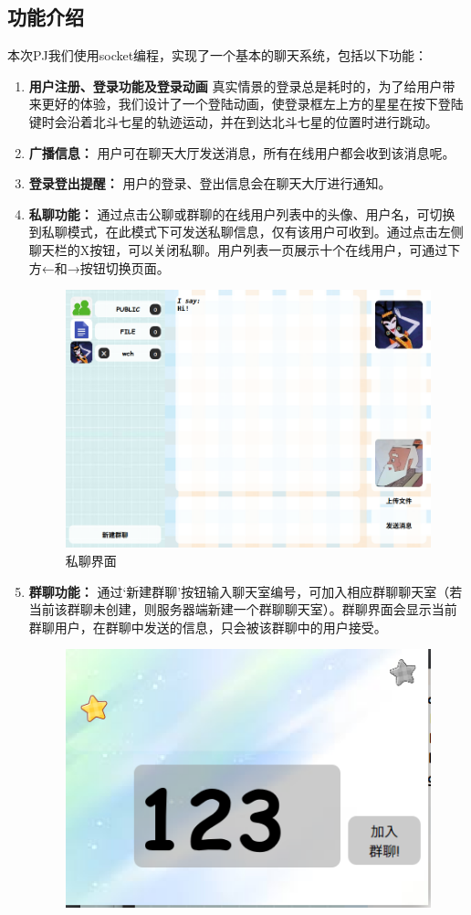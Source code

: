 \documentclass[12pt]{article} %
\begin{document}
\begin{sloppypar}
\subsection{功能介绍}

本次PJ我们使用socket编程，实现了一个基本的聊天系统，包括以下功能：
\begin{enumerate}
	\item {\bf 用户注册、登录功能及登录动画} 真实情景的登录总是耗时的，为了给用户带来更好的体验，我们设计了一个登陆动画，使登录框左上方的星星在按下登陆键时会沿着北斗七星的轨迹运动，并在到达北斗七星的位置时进行跳动。
	\item {\bf 广播信息：} 用户可在聊天大厅发送消息，所有在线用户都会收到该消息呢。 
	\item {\bf 登录登出提醒：} 用户的登录、登出信息会在聊天大厅进行通知。
	\item {\bf 私聊功能：} 通过点击公聊或群聊的在线用户列表中的头像、用户名，可切换到私聊模式，在此模式下可发送私聊信息，仅有该用户可收到。通过点击左侧聊天栏的X按钮，可以关闭私聊。用户列表一页展示十个在线用户，可通过下方←和→按钮切换页面。
	\begin{figure}[htbp]
		\centering
		\includegraphics[width=0.7\linewidth]{figure/private.png}
		\caption{私聊界面}
	\end{figure}
	\item {\bf 群聊功能：} 通过‘新建群聊’按钮输入聊天室编号，可加入相应群聊聊天室（若当前该群聊未创建，则服务器端新建一个群聊聊天室）。群聊界面会显示当前群聊用户，在群聊中发送的信息，只会被该群聊中的用户接受。
	\begin{figure}[htbp]
		\centering
		\includegraphics[width=0.4\linewidth]{figure/group.png}

\end{figure}
\end{enumerate}
\end{sloppypar}
\end{document}
